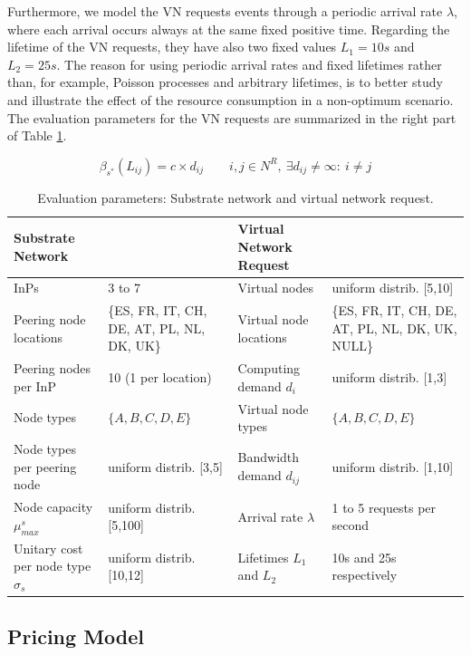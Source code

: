 \begin{itemize}
Furthermore, we model the VN requests events through a periodic arrival rate $\lambda$, where each arrival occurs always at the same fixed positive time. Regarding the lifetime of the VN requests, they have also two fixed values $L_1 = 10s$ and $L_2 = 25s$. The reason for using periodic arrival rates and fixed lifetimes rather than, for example, Poisson processes and arbitrary lifetimes, is to better study and illustrate the effect of the resource consumption in a non-optimum scenario. The evaluation parameters for the VN requests are summarized in the right part of Table \ref{tab:evparams}.

\end{itemize}

  \begin{equation} \label{eq:ev_linkCosts}
	\beta_{s^{*}}(L_{ij}) = c \times d_{ij} \qquad i,j \in N^R, \ \exists d_{ij} \neq \infty : \ i \neq j
  \end{equation}

\begin{table}[bth]
	\myfloatalign \footnotesize
	\begin{tabularx}{\textwidth}{p{4.5cm}p{3.5cm}|p{4cm}p{4cm}}
	 	\textbf{Substrate Network} && \textbf{Virtual Network Request} \\
		\hline
		InPs & 3 to 7 & Virtual nodes & uniform distrib. [5,10] \\
		Peering node locations & \{ES, FR, IT, CH, DE, AT, PL, NL, DK, UK\} & Virtual node locations & \{ES, FR, IT, CH, DE, AT, PL, NL, DK, UK, NULL\}  \\
		Peering nodes per InP & 10 (1 per location) & Computing demand $d_i$ & uniform distrib. [1,3] \\
		Node types & $\{A, B, C, D, E\}$ & Virtual node types & $\{A, B, C, D, E\}$ \\
		Node types per peering node & uniform distrib. [3,5]  & Bandwidth demand $d_{ij}$ & uniform distrib. [1,10] \\
		Node capacity $\mu^{s}_{max}$ & uniform distrib. [5,100] & Arrival rate $\lambda$ & 1 to 5 requests per second \\
		Unitary cost per node type $\sigma_s$ & uniform distrib. [10,12] & Lifetimes $L_1$ and $L_2$ & 10s and 25s respectively
	\end{tabularx}
	\caption{Evaluation parameters: Substrate network and virtual network request.}
	\label{tab:evparams}
\end{table} 

\subsection{Pricing Model} \label{pricing model}

